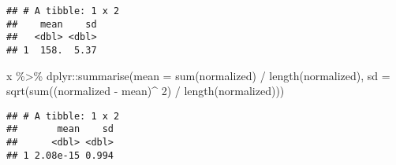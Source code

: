 \documentclass[
  12pt,
]{book}
\newenvironment{Shaded}{\begin{snugshade}}{\end{snugshade}}
\newcommand{\AttributeTok}[1]{\textcolor[rgb]{0.77,0.63,0.00}{#1}}
\newcommand{\DecValTok}[1]{\textcolor[rgb]{0.00,0.00,0.81}{#1}}
\newcommand{\FunctionTok}[1]{\textcolor[rgb]{0.00,0.00,0.00}{#1}}
\newcommand{\NormalTok}[1]{#1}
\newcommand{\SpecialCharTok}[1]{\textcolor[rgb]{0.00,0.00,0.00}{#1}}
\begin{document}
\begin{verbatim}
## # A tibble: 1 x 2
##    mean    sd
##   <dbl> <dbl>
## 1  158.  5.37
\end{verbatim}

\begin{Shaded}
\begin{Highlighting}[]
\NormalTok{x }\SpecialCharTok{\%\textgreater{}\%} 
\NormalTok{  dplyr}\SpecialCharTok{::}\FunctionTok{summarise}\NormalTok{(}\AttributeTok{mean =} \FunctionTok{sum}\NormalTok{(normalized) }\SpecialCharTok{/} \FunctionTok{length}\NormalTok{(normalized),}
                   \AttributeTok{sd =} \FunctionTok{sqrt}\NormalTok{(}\FunctionTok{sum}\NormalTok{((normalized }\SpecialCharTok{{-}}\NormalTok{ mean)}\SpecialCharTok{\^{}} \DecValTok{2}\NormalTok{) }\SpecialCharTok{/} \FunctionTok{length}\NormalTok{(normalized)))}
\end{Highlighting}
\end{Shaded}

\begin{verbatim}
## # A tibble: 1 x 2
##       mean    sd
##      <dbl> <dbl>
## 1 2.08e-15 0.994
\end{verbatim}


\end{document}
